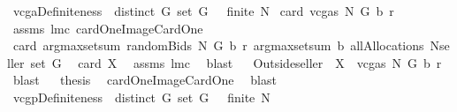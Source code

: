 \begin{isabellebody}
\isamarkupfalse%
\ vcgaDefiniteness{\isacharcolon}\ \ {\isachardoublequoteopen}distinct\ G{\isachardoublequoteclose}\ {\isachardoublequoteopen}set\ G\ {\isasymnoteq}\ {\isacharbraceleft}{\isacharbraceright}{\isachardoublequoteclose}\ {\isachardoublequoteopen}finite\ N{\isachardoublequoteclose}\ \isanewline
{\isachardoublequoteopen}card\ {\isacharparenleft}vcgas\ N\ G\ b\ r{\isacharparenright}{\isacharequal}{}{\isachardoublequoteclose}\isanewline
%
\isadelimproof
%
\endisadelimproof
%
\isatagproof
{}\isamarkupfalse%
\ assms\ lm{}{}c\ cardOneImageCardOne\ \isanewline
{}\isamarkupfalse%
\ {\isacharminus}\isanewline
{}\isamarkupfalse%
\ {\isachardoublequoteopen}card\ {\isacharparenleft}{\isacharparenleft}argmax{\isasymcirc}setsum{\isacharparenright}\ {\isacharparenleft}randomBids{\isacharprime}\ N\ G\ b\ r{\isacharparenright}\ {\isacharparenleft}{\isacharparenleft}argmax{\isasymcirc}setsum{\isacharparenright}\ b\ {\isacharparenleft}allAllocations\ {\isacharparenleft}N{\isasymunion}{\isacharbraceleft}seller{\isacharbraceright}{\isacharparenright}\ {\isacharparenleft}set\ G{\isacharparenright}{\isacharparenright}{\isacharparenright}{\isacharparenright}{\isacharequal}{}{\isachardoublequoteclose}\ \isanewline
{\isacharparenleft}\ {\isachardoublequoteopen}card\ {\isacharquery}X{\isacharequal}{\isacharunderscore}{\isachardoublequoteclose}{\isacharparenright}\ \isamarkupfalse%
\ assms\ lm{}{}c\ \isamarkupfalse%
\ blast\isanewline
{}\isamarkupfalse%
\ \isamarkupfalse%
\ {\isachardoublequoteopen}{\isacharparenleft}Outside{\isacharprime}{\isacharbraceleft}seller{\isacharbraceright}{\isacharparenright}\ {\isacharbackquote}\ {\isacharquery}X\ {\isacharequal}\ vcgas\ N\ G\ b\ r{\isachardoublequoteclose}\ \isamarkupfalse%
\ blast\isanewline
{}\isamarkupfalse%
\ \isamarkupfalse%
\ {\isacharquery}thesis\ \isamarkupfalse%
\ cardOneImageCardOne\ \isamarkupfalse%
\ blast\isanewline
{}\isamarkupfalse%
%
\endisatagproof
{\isafoldproof}%
%
\isadelimproof
\isanewline
%
\endisadelimproof
\isanewline
{}\isamarkupfalse%
\ vcgpDefiniteness{\isacharcolon}\ \ {\isachardoublequoteopen}distinct\ G{\isachardoublequoteclose}\ {\isachardoublequoteopen}set\ G\ {\isasymnoteq}\ {\isacharbraceleft}{\isacharbraceright}{\isachardoublequoteclose}\ {\isachardoublequoteopen}finite\ N{\isachardoublequoteclose}\ \isanewline

\end{isabellebody}
